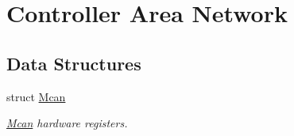 \hypertarget{group__SAME70__MCAN}{}\section{Controller Area Network}
\label{group__SAME70__MCAN}
\subsection*{Data Structures}
\begin{DoxyCompactItemize}
\item 
struct \mbox{\hyperlink{structMcan}{Mcan}}
\begin{DoxyCompactList}\small\item\em \mbox{\hyperlink{structMcan}{Mcan}} hardware registers. \end{DoxyCompactList}\end{DoxyCompactItemize}
